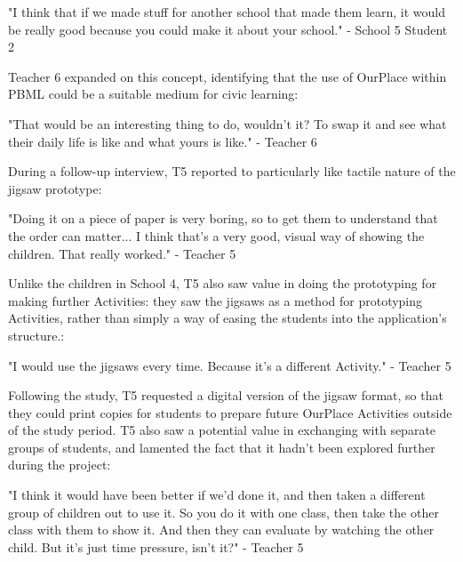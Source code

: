 \begin{displayquote}
"I think that if we made stuff for another school that made them learn, it would be really good because you could make it about your school." - School 5 Student 2
\end{displayquote}

Teacher 6 expanded on this concept, identifying that the use of OurPlace within PBML could be a suitable medium for civic learning: 

\begin{displayquote}
"That would be an interesting thing to do, wouldn't it? To swap it and see what their daily life is like and what yours is like." - Teacher 6
\end{displayquote}

During a follow-up interview, T5 reported to particularly like tactile nature of the jigsaw prototype: 

\begin{displayquote}
"Doing it on a piece of paper is very boring, so to get them to understand that the order can matter... I think that's a very good, visual way of showing the children. That really worked." - Teacher 5
\end{displayquote}

Unlike the children in School 4, T5 also saw value in doing the prototyping for making further Activities: they saw the jigsaws as a method for prototyping Activities, rather than simply a way of easing the students into the application's structure.: 

\begin{displayquote}
"I would use the jigsaws every time. Because it's a different Activity." - Teacher 5
\end{displayquote}

Following the study, T5 requested a digital version of the jigsaw format, so that they could print copies for students to prepare future OurPlace Activities outside of the study period. T5 also saw a potential value in exchanging with separate groups of students, and lamented the fact that it hadn't been explored further during the project: 

\begin{displayquote}
"I think it would have been better if we'd done it, and then taken a different group of children out to use it. So you do it with one class, then take the other class with them to show it. And then they can evaluate by watching the other child. But it's just time pressure, isn't it?" - Teacher 5
\end{displayquote}


